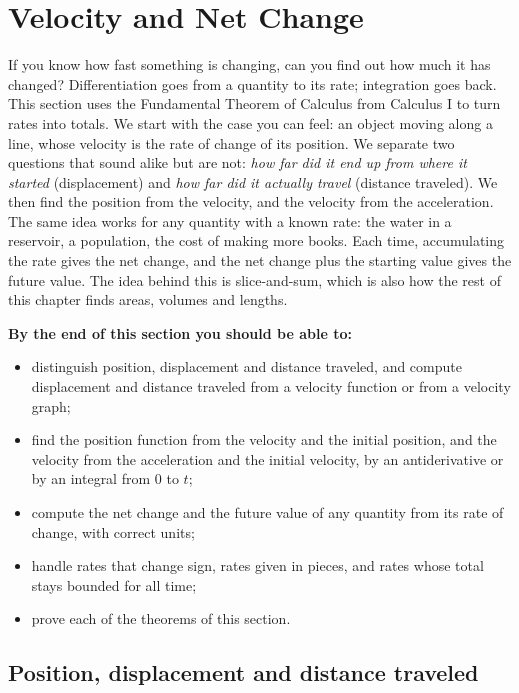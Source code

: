 \documentclass[11pt]{article}
\begin{document}
\section{Velocity and Net Change}

\begin{guide}
If you know how fast something is changing, can you find out how much it has changed? Differentiation goes from a quantity to its rate; integration goes back. This section uses the Fundamental Theorem of Calculus from Calculus I to turn rates into totals. We start with the case you can feel: an object moving along a line, whose velocity is the rate of change of its position. We separate two questions that sound alike but are not: \emph{how far did it end up from where it started} (displacement) and \emph{how far did it actually travel} (distance traveled). We then find the position from the velocity, and the velocity from the acceleration. The same idea works for any quantity with a known rate: the water in a reservoir, a population, the cost of making more books. Each time, accumulating the rate gives the net change, and the net change plus the starting value gives the future value. The idea behind this is slice-and-sum, which is also how the rest of this chapter finds areas, volumes and lengths.
\end{guide}

\textbf{By the end of this section you should be able to:}
\begin{itemize}
  \item distinguish position, displacement and distance traveled, and compute displacement and distance traveled from a velocity function or from a velocity graph;
  \item find the position function from the velocity and the initial position, and the velocity from the acceleration and the initial velocity, by an antiderivative or by an integral from $0$ to $t$;
  \item compute the net change and the future value of any quantity from its rate of change, with correct units;
  \item handle rates that change sign, rates given in pieces, and rates whose total stays bounded for all time;
  \item prove each of the theorems of this section.
\end{itemize}

\subsection*{Position, displacement and distance traveled}
\end{document}
